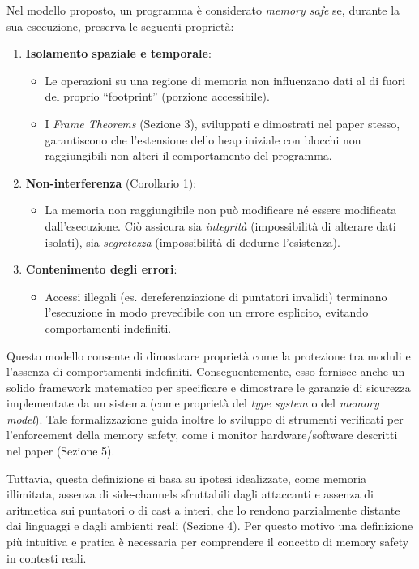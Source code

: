 Nel modello proposto, un programma è considerato \textit{memory safe} se,
durante la sua esecuzione, preserva le seguenti proprietà:
\begin{enumerate}
  \item \textbf{Isolamento spaziale e temporale}:
    \begin{itemize}
      \item Le operazioni su una regione di memoria non influenzano dati al di fuori
        del proprio ``footprint'' (porzione accessibile).

      \item I \textit{Frame Theorems} (Sezione 3), sviluppati e dimostrati nel paper
        stesso, garantiscono che l'estensione dello heap iniziale con blocchi
        non raggiungibili non alteri il comportamento del programma.
    \end{itemize}

  \item \textbf{Non-interferenza} (Corollario 1):
    \begin{itemize}
      \item La memoria non raggiungibile non può modificare né essere modificata
        dall'esecuzione. Ciò assicura sia \textit{integrità} (impossibilità di
        alterare dati isolati), sia \textit{segretezza} (impossibilità di
        dedurne l'esistenza).
    \end{itemize}

  \item \textbf{Contenimento degli errori}:
    \begin{itemize}
      \item Accessi illegali (es. dereferenziazione di puntatori invalidi)
        terminano l'esecuzione in modo prevedibile con un errore esplicito, evitando
        comportamenti indefiniti.
    \end{itemize}
\end{enumerate}

Questo modello consente di dimostrare proprietà come la protezione tra moduli e l'assenza
di comportamenti indefiniti. Conseguentemente, esso fornisce anche un solido framework
matematico per specificare e dimostrare le garanzie di sicurezza implementate da
un sistema (come proprietà del \textit{type system} o del \textit{memory model}).
Tale formalizzazione guida inoltre lo sviluppo di strumenti verificati per l'enforcement
della memory safety, come i monitor hardware/software descritti nel paper (Sezione
5).

Tuttavia, questa definizione si basa su ipotesi idealizzate, come memoria illimitata,
assenza di side-channels sfruttabili dagli attaccanti e assenza di aritmetica
sui puntatori o di cast a interi, che lo rendono parzialmente distante dai linguaggi
e dagli ambienti reali (Sezione 4). Per questo motivo una definizione più
intuitiva e pratica è necessaria per comprendere il concetto di memory safety in
contesti reali.


